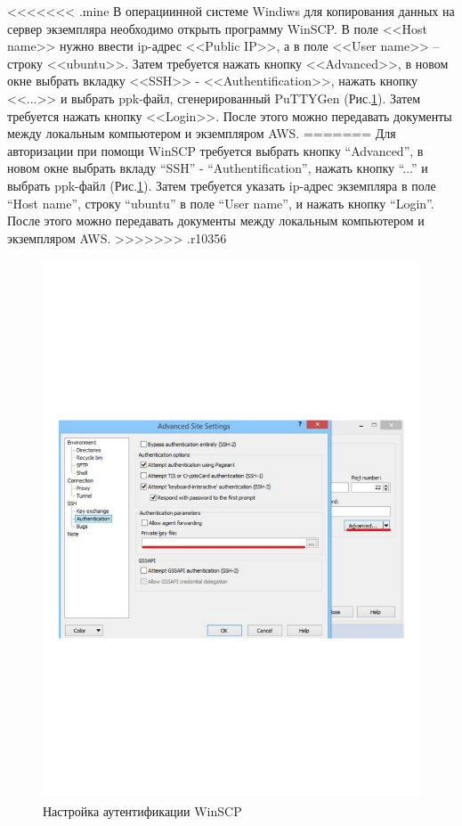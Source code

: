 \documentclass[12pt,twoside]{article}
\begin{document}
<<<<<<< .mine
В операциинной системе Windiws для копирования данных на сервер экземпляра необходимо открыть программу WinSCP. В поле <<Host name>> нужно ввести ip-адрес <<Public IP>>, а в поле <<User name>> -- строку <<ubuntu>>. Затем требуется нажать кнопку <<Advanced>>, в новом окне выбрать вкладку
<<SSH>> - <<Authentification>>, нажать кнопку <<...>> и выбрать ppk-файл, сгенерированный PuTTYGen (Рис.\ref{fig:scp}). Затем требуется нажать кнопку <<Login>>. После этого можно передавать документы между локальным компьютером и экземпляром AWS.
=======
Для авторизации при помощи WinSCP требуется выбрать кнопку ``Advanced'', в новом окне выбрать вкладу
``SSH'' - ``Authentification'', нажать кнопку ``...'' и выбрать ppk-файл (Рис.\ref{fig:scp}). Затем требуется указать ip-адрес экземпляра в поле ``Host name'', строку ``ubuntu'' в поле ``User name'', и нажать кнопку ``Login''. После этого можно передавать документы между локальным компьютером и экземпляром AWS.
>>>>>>> .r10356
\begin{figure}[tb!]
  \centering
      \includegraphics[height=16cm]{scp.pdf}
  \caption{Настройка аутентификации WinSCP}
  \label{fig:scp}
\end{figure}
\end{document}
